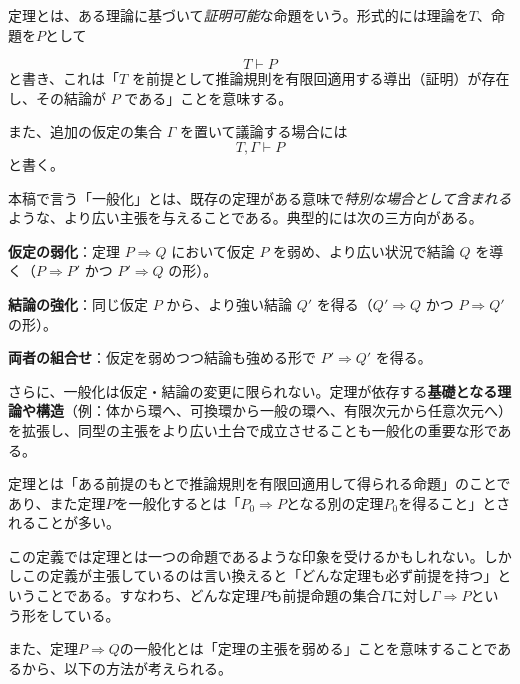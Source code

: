 \documentclass[a4paper,12pt]{bxjsbook}
\newlength{\customindent}
\newenvironment{body}{
  \par
  \begingroup
  \setlength{\leftskip}{\customindent}
  \setlength{\rightskip}{0pt}
  \setlength{\parindent}{1em}
  \setlength{\displayindent}{\customindent}
  \setlength{\displaywidth}{\dimexpr\linewidth-\customindent\relax}
}{
  \par
  \endgroup
}
\theoremstyle{theorem}
\begin{document}
    \begin{body}
        \indent 定理とは、ある理論に基づいて\emph{証明可能}な命題をいう。形式的には理論を$T$、命題を$P$として

        \[
          T⊢P
        \]
        と書き、これは「$T$ を前提として推論規則を有限回適用する導出（証明）が存在し、その結論が $P$ である」ことを意味する。
        
        \indent また、追加の仮定の集合 $Γ$ を置いて議論する場合には
        \[
          T,Γ⊢P
        \]
        と書く。
        
        \indent 本稿で言う「一般化」とは、既存の定理がある意味で\emph{特別な場合として含まれる}ような、より広い主張を与えることである。典型的には次の三方向がある。
        \begin{bodyitemize}[leftmargin=3.5em]
            \item \textbf{仮定の弱化}：定理 $P⇒Q$ において仮定 $P$ を弱め、より広い状況で結論 $Q$ を導く（$P \Rightarrow P'$ かつ $P'⇒Q$ の形）。
            \item \textbf{結論の強化}：同じ仮定 $P$ から、より強い結論 $Q'$ を得る（$Q' \Rightarrow Q$ かつ $P⇒Q'$ の形）。
            \item \textbf{両者の組合せ}：仮定を弱めつつ結論も強める形で $P'⇒Q'$ を得る。
        \end{bodyitemize}
        
        \indent さらに、一般化は仮定・結論の変更に限られない。定理が依存する\textbf{基礎となる理論や構造}（例：体から環へ、可換環から一般の環へ、有限次元から任意次元へ）を拡張し、同型の主張をより広い土台で成立させることも一般化の重要な形である。
    \end{body}

    \begin{body}
        \indent 定理とは「ある前提のもとで推論規則を有限回適用して得られる命題」のことであり、また定理$P$を一般化するとは「$P_0⇒P$となる別の定理$P_0$を得ること」とされることが多い。

        \indent この定義では定理とは一つの命題であるような印象を受けるかもしれない。しかしこの定義が主張しているのは言い換えると「どんな定理も必ず前提を持つ」ということである。すなわち、どんな定理$P$も前提命題の集合$Γ$に対し$Γ⇒P$という形をしている。


        \indent また、定理$P⇒Q$の一般化とは「定理の主張を弱める」ことを意味することであるから、以下の方法が考えられる。
    \end{body}
\end{document}
